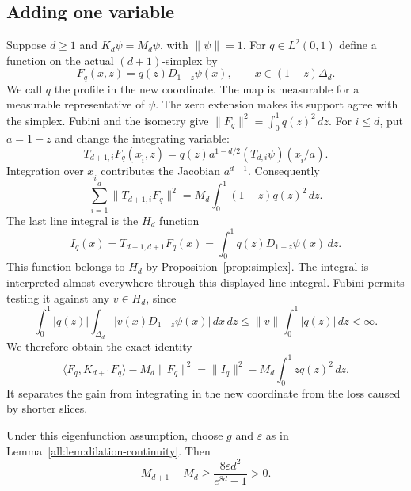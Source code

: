 \documentclass[11pt]{article}
\begin{document}
\subsection{Adding one variable}

Suppose $d\geq1$ and $K_d\psi=M_d\psi$, with $\|\psi\|=1$.
For $q\in L^2(0,1)$ define a function on the actual $(d+1)$-simplex by
\begin{equation}\label{all:eq:lift}
 F_q(x,z)=q(z)D_{1-z}\psi(x),\qquad x\in(1-z)\Delta_d.
\end{equation}
We call $q$ the profile in the new coordinate.
The map is measurable for a measurable representative of $\psi$.
The zero extension makes its support agree with the simplex.
Fubini and the isometry give $\|F_q\|^2=\int_0^1q(z)^2\,dz$.
For $i\leq d$, put $a=1-z$ and change the integrating variable:
\[
 T_{d+1,i}F_q(x_{\widehat i},z)
 =q(z)a^{1-d/2}(T_{d,i}\psi)(x_{\widehat i}/a).
\]
Integration over $x_{\widehat i}$ contributes the Jacobian $a^{d-1}$.
Consequently
\[
 \sum_{i=1}^d\|T_{d+1,i}F_q\|^2
       =M_d\int_0^1(1-z)q(z)^2\,dz.
\]
The last line integral is the $H_d$ function
\[
 I_q(x)=T_{d+1,d+1}F_q(x)
       =\int_0^1q(z)D_{1-z}\psi(x)\,dz.
\]
This function belongs to $H_d$ by Proposition~\ref{prop:simplex}.
The integral is interpreted almost everywhere through this displayed
line integral.  Fubini permits testing it against any $v\in H_d$, since
\[
 \int_0^1 |q(z)|\int_{\Delta_d}|v(x)D_{1-z}\psi(x)|\,dx\,dz
 \leq\|v\|\int_0^1|q(z)|\,dz<\infty.
\]
We therefore obtain the exact identity
\begin{equation}\label{all:eq:excess}
 \langle F_q,K_{d+1}F_q\rangle-M_d\|F_q\|^2
       =\|I_q\|^2-M_d\int_0^1zq(z)^2\,dz.
\end{equation}
It separates the gain from integrating in the new coordinate from the
loss caused by shorter slices.

\begin{proposition}\label{all:prop:strict-increase}
Under this eigenfunction assumption, choose $g$ and $\varepsilon$ as in
Lemma~\ref{all:lem:dilation-continuity}.  Then
\begin{equation}\label{all:eq:positive-gap}
 M_{d+1}-M_d\geq\frac{8\varepsilon d^2}{e^{8d}-1}>0.
\end{equation}
\end{proposition}
\end{document}
